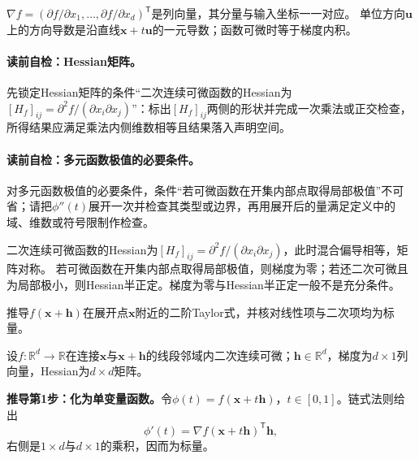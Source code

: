 $\nabla f=(\partial f/\partial x_1,\ldots,\partial f/\partial x_d)^{\mathsf T}$是列向量，其分量与输入坐标一一对应。
单位方向$\boldsymbol u$上的方向导数是沿直线$\boldsymbol{x}+t\boldsymbol u$的一元导数；函数可微时等于梯度内积。


\paragraph{读前自检：Hessian矩阵。}先锁定Hessian矩阵的条件“二次连续可微函数的Hessian为$[H_f]_{ij}=\partial^2f/(\partial x_i\partial x_j)$”：标出$[H_f]_{ij}$两侧的形状并完成一次乘法或正交检查，所得结果应满足乘法内侧维数相等且结果落入声明空间。\par
\paragraph{读前自检：多元函数极值的必要条件。}对多元函数极值的必要条件，条件“若可微函数在开集内部点取得局部极值”不可省；请把$\phi''(t)$展开一次并检查其类型或边界，再用展开后的量满足定义中的域、维数或符号限制作检查。\par

二次连续可微函数的Hessian为$[H_f]_{ij}=\partial^2f/(\partial x_i\partial x_j)$，此时混合偏导相等，矩阵对称。
若可微函数在开集内部点取得局部极值，则梯度为零；若还二次可微且为局部极小，则Hessian半正定。梯度为零与Hessian半正定一般不是充分条件。

\begin{derivationgoalbox}
推导$f(\boldsymbol x+\boldsymbol h)$在展开点$\boldsymbol x$附近的二阶Taylor式，并核对线性项与二次项均为标量。
\end{derivationgoalbox}
\begin{derivationprepbox}
设$f:\mathbb R^d\to\mathbb R$在连接$\boldsymbol x$与$\boldsymbol x+\boldsymbol h$的线段邻域内二次连续可微；$\boldsymbol h\in\mathbb R^d$，梯度为$d\times1$列向量，Hessian为$d\times d$矩阵。
\end{derivationprepbox}
\textbf{推导第1步：化为单变量函数。}令$\phi(t)=f(\boldsymbol x+t\boldsymbol h)$，$t\in[0,1]$。链式法则给出
\[
\phi'(t)=\nabla f(\boldsymbol x+t\boldsymbol h)^{\mathsf T}\boldsymbol h,
\]
右侧是$1\times d$与$d\times1$的乘积，因而为标量。


